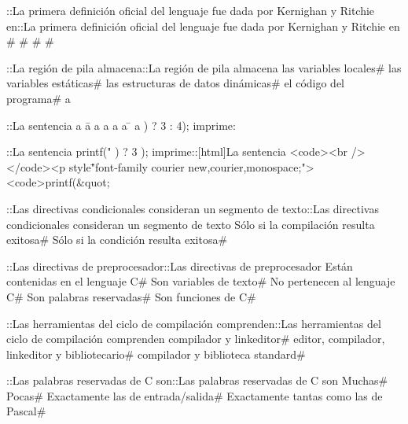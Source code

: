 {{{{{{{{{\question ::La primera definición oficial del lenguaje fue dada por Kernighan y Ritchie en::La primera definición oficial del lenguaje fue dada por Kernighan y Ritchie en
# 
# 
# 
# 

\question ::La región de pila almacena::La región de pila almacena
\correctchoice las variables locales# 
\choice las variables estáticas# 
\choice las estructuras de datos dinámicas# 
\choice el código del programa# 
\correctchoice a %

\question ::La sentencia a \= a %
\correctchoice a %
\choice a%
\correctchoice a %
\choice a \=%
\correctchoice %
\choice a%
) ? 3 : 4); imprime: 

\question ::La sentencia printf("%
) ? 3 ); imprime\:::[html]La sentencia <code><br /></code>\n<p style\="font-family\: courier new,courier,monospace;"><code>printf(&quot;%

\question ::Las directivas condicionales consideran un segmento de texto::Las directivas condicionales consideran un segmento de texto
\choice Sólo si la compilación resulta exitosa# 
\correctchoice Sólo si la condición resulta exitosa# 

\question ::Las directivas de preprocesador::Las directivas de preprocesador
\choice Están contenidas en el lenguaje C# 
\choice Son variables de texto# 
\correctchoice No pertenecen al lenguaje C# 
\choice Son palabras reservadas# 
\choice Son funciones de C# 

\question ::Las herramientas del ciclo de compilación comprenden::Las herramientas del ciclo de compilación comprenden
\choice compilador y linkeditor# 
\correctchoice editor, compilador, linkeditor y bibliotecario# 
\choice compilador y biblioteca standard# 

\question ::Las palabras reservadas de C son::Las palabras reservadas de C son
\choice Muchas# 
\correctchoice Pocas# 
\choice Exactamente las de entrada/salida# 
\choice Exactamente tantas como las de Pascal# 

}}}}}}}}}
